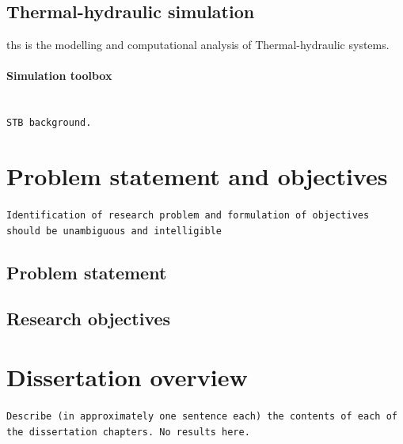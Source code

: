 \subsection{Thermal-hydraulic simulation}
\gls{ths} is the modelling and computational analysis of Thermal-hydraulic systems.
\paragraph{Simulation toolbox}\leavevmode\\
\texttt{STB background.}
\section{Problem statement and objectives}
\texttt{Identification of research problem and formulation of objectives should be unambiguous and intelligible}
\subsection{Problem statement}
\subsection{Research objectives}

\section{Dissertation overview}
\texttt{Describe (in approximately one sentence each) the contents of each of the dissertation chapters. No results here.}